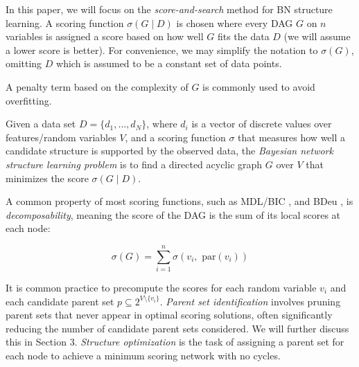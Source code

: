 \documentclass[twoside,11pt]{article}
\begin{document}
In this paper, we will focus on the \emph{score-and-search} method for BN structure learning. A scoring function $\sigma( \mathit{G} \mid D )$ is chosen where
every DAG $G$ on $n$ variables is assigned a score based on how well $G$ fits the data $D$ (we will assume a lower score is better). For convenience, we may simplify 
the notation to $\sigma( \mathit{G} )$, omitting $D$ which is assumed to be a constant set of data points. 

\medskip
A penalty term based on the complexity of $G$ is commonly used to
avoid overfitting.

\medskip

\begin{definition}
Given a data set $D = \{d_1, \ldots, d_N\}$, where $d_i$
is a vector of discrete values over features/random variables
$\mathit{V}$, and a scoring function $\sigma$ that measures how
well a candidate structure is supported by the observed data,
the \emph{Bayesian network structure learning problem} is to
find a directed acyclic graph $\mathit{G}$ over $\mathit{V}$
that minimizes the score $\sigma( \mathit{G} \mid D )$.
\end{definition}


\bigskip

A common property of most scoring functions, such as MDL/BIC \citep{Schwarz78}, and BDeu \citep{HeckermanGC95}, is \emph{decomposability}, meaning the score of 
the DAG is the sum of its local scores at each node: 

$$\sigma( \mathit{G} ) = \sum_{i = 1}^{n} \sigma(v_i,\text{ par}(v_i))$$

It is common practice to precompute the scores for each random variable $v_i$ and each candidate parent set $p \subseteq 2^{V \setminus \{v_i\} }$. \emph{Parent set
identification} involves pruning parent sets that never appear in optimal scoring solutions, often significantly reducing the number of candidate parent sets considered. We will further 
discuss this in Section 3. \emph{Structure optimization} is the task of assigning a parent set for each node to achieve a minimum scoring network with no cycles.


\medskip
\end{document}
